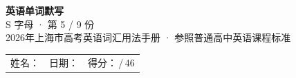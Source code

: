 \documentclass[10pt,a4paper]{article}
\begin{document}
\pagestyle{plain}

\begin{center}
{\LARGE\bfseries 英语单词默写}\\[0.22em]
{\large S 字母 · 第 5 / 9 份}\\[0.18em]
{\small 2026年上海市高考英语词汇用法手册 · 参照普通高中英语课程标准}
\end{center}

\vspace{0.25em}
\noindent\begin{tabular}{@{}p{}@{}p{}@{}p{}@{}}
姓名：\underline{\hspace{2.0cm}} & 日期：\underline{\hspace{2.0cm}} & 得分：\underline{\hspace{1.3cm}}\,/\,46 \\
\end{tabular}

\vspace{0.3em}

\vspace{0.08em}
\end{document}
